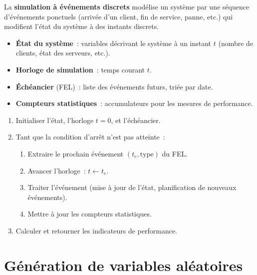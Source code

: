 \begin{definition}
La \textbf{simulation \`a \'ev\'enements discrets} mod\'elise un syst\`eme par
une s\'equence d'\'ev\'enements ponctuels (arriv\'ee d'un client, fin de
service, panne, etc.) qui modifient l'\'etat du syst\`eme \`a des instants
discrets.
\end{definition}

\begin{definition}
\begin{itemize}
  \item \textbf{\'Etat du syst\`eme}~: variables d\'ecrivant le syst\`eme \`a
        un instant $t$ (nombre de clients, \'etat des serveurs, etc.).
  \item \textbf{Horloge de simulation}~: temps courant $t$.
  \item \textbf{\'Ech\'eancier} (FEL)~: liste des \'ev\'enements futurs,
        tri\'ee par date.
  \item \textbf{Compteurs statistiques}~: accumulateurs pour les mesures de
        performance.
\end{itemize}
\end{definition}

\begin{algorithme}[title=\textbf{Boucle principale de simulation DES}]
\begin{enumerate}
  \item Initialiser l'\'etat, l'horloge $t = 0$, et l'\'ech\'eancier.
  \item Tant que la condition d'arr\^et n'est pas atteinte~:
    \begin{enumerate}
      \item Extraire le prochain \'ev\'enement $(t_e, \text{type})$ du FEL.
      \item Avancer l'horloge~: $t \leftarrow t_e$.
      \item Traiter l'\'ev\'enement (mise \`a jour de l'\'etat, planification
            de nouveaux \'ev\'enements).
      \item Mettre \`a jour les compteurs statistiques.
    \end{enumerate}
  \item Calculer et retourner les indicateurs de performance.
\end{enumerate}
\end{algorithme}

\section{G\'en\'eration de variables al\'eatoires}

